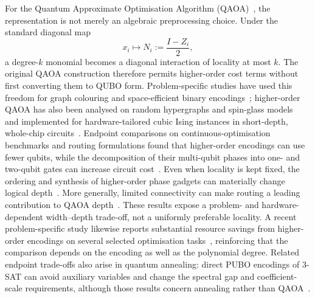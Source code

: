 \documentclass[a4paper,onecolumn,11pt,unpublished]{quantumarticle}
\theoremstyle{remark}
\begin{document}
For the Quantum Approximate Optimisation Algorithm (QAOA)~\cite{Farhi2014},
the representation is not merely an algebraic preprocessing choice.  Under the
standard diagonal map
\[
    x_i\longmapsto N_i:=\frac{I-Z_i}{2},
\]
a degree-$k$ monomial becomes a diagonal interaction of locality at most $k$.
The original QAOA construction therefore permits higher-order cost terms
without first converting them to QUBO form.  Problem-specific studies have used
this freedom for graph colouring and space-efficient binary
encodings~\cite{CampbellDahl2022,Glos2022}; higher-order QAOA has also been
analysed on random hypergraphs and spin-glass models~\cite{Basso2022} and
implemented for hardware-tailored cubic Ising instances in short-depth,
whole-chip circuits~\cite{PelofskeShortDepth2024,Pelofske2024}.
Endpoint comparisons on continuous-optimisation benchmarks and routing
formulations found that higher-order encodings can use fewer qubits, while the
decomposition of their multi-qubit phases into one- and two-qubit gates can
increase circuit cost~\cite{Stein2023,Bell2025}.  Even when locality is
kept fixed, the ordering and synthesis of higher-order phase gadgets can
materially change logical depth~\cite{Verchere2023}.  More generally,
limited connectivity can make routing a leading contribution to QAOA
depth~\cite{Weidenfeller2022}.  These results expose a problem- and
hardware-dependent width--depth trade-off, not a uniformly preferable
locality.  A recent problem-specific study likewise reports substantial
resource savings from higher-order encodings on several selected optimisation
tasks~\cite{Koch2026}, reinforcing that the comparison depends on the
encoding as well as the polynomial degree.  Related endpoint trade-offs also
arise in quantum annealing: direct
PUBO encodings of 3-SAT can avoid auxiliary variables and change the spectral
gap and coefficient-scale requirements, although those results concern
annealing rather than QAOA~\cite{Nagies2025}.
\end{document}
